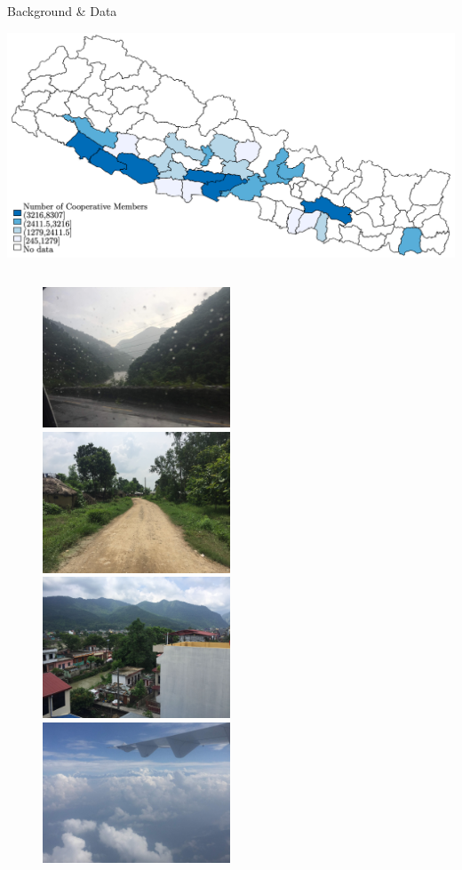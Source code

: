 \documentclass[aspectratio=169]{beamer}
\begin{document}
\begin{frame}{Background \& Data}
    \begin{center}
        \includegraphics[width=.9\textwidth]{StudyMap.png}
    \end{center}
\end{frame}

\begin{frame}
\begin{columns}[t]
\centering
\includegraphics[width=7.7cm,height=4.2cm]{travel1.jpg}\\
\includegraphics[width=7.7cm,height=4.2cm]{travel3.jpg}
\centering
\includegraphics[width=7.7cm,height=4.2cm]{travel2.jpg}\\
\includegraphics[width=7.7cm,height=4.2cm]{travel4.jpg}
\end{columns}
\end{frame}
\end{document}
